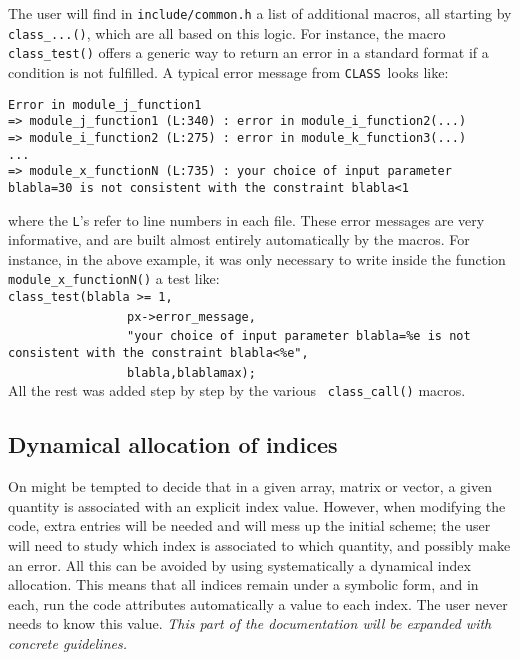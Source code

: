 \documentclass{article}
\newcommand\CLASS{{\tt CLASS}~}
\begin{document}
The user
will find in {\tt include/common.h} a list of additional macros, all
starting by {\tt class\_...()}, which are all based on this logic. For
instance, the macro {\tt class\_test()} offers a generic way to return
an error in a standard format if a condition is not fulfilled. A
typical error message from \CLASS looks like:

\vspace{0.5cm}

\noindent
{\tt Error in module\_j\_function1\\
=> module\_j\_function1 (L:340) : error in module\_i\_function2(...)\\
=> module\_i\_function2 (L:275) : error in module\_k\_function3(...)\\
...\\
=> module\_x\_functionN (L:735) : your choice of input parameter blabla=30
is not consistent with the constraint blabla<1\\}

\noindent
where the {\tt L}'s refer to line numbers in each file. These error
messages are very informative, and are built almost entirely
automatically by the macros. For instance, in the above example, it
was only necessary to write inside the function {\tt module\_x\_functionN()} a test like:\\

\noindent
{\tt class\_test(blabla >= 1,}\\
\mbox{ }~~~~~~~~~~~~~~~~{\tt px->error\_message,} \\ 
\mbox{ }~~~~~~~~~~~~~~~~{\tt "your choice of input parameter blabla=\%e
is not consistent with the constraint blabla<\%e",}\\
\mbox{ }~~~~~~~~~~~~~~~~{\tt blabla,blablamax);}\\

\noindent All
the rest was added step by step by the various {\tt
class\_call()} macros.

\subsection{Dynamical allocation of indices}

On might be tempted to decide that in a given array, matrix or vector, a given quantity is associated with an explicit index value. However, when modifying the code, extra entries will be needed and will mess up the initial scheme; the user will need to study which index is associated to which quantity, and possibly make an error. All this can be avoided by using systematically a dynamical index allocation. This means that all indices remain under a symbolic form, and in each, run the code attributes automatically a value to each index. The user never needs to know this value.
{\it This part of the documentation will be expanded with concrete guidelines.}
\end{document}
